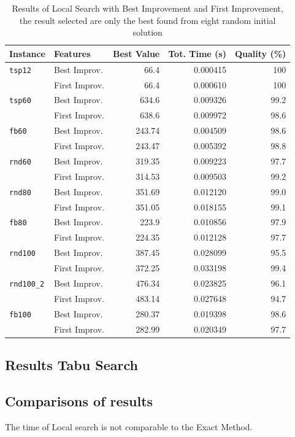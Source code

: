 	\begin{table}
		\centering
		\begin{tabular}{llrrr}
			\toprule
			\textbf{Instance} & \textbf{Features} & \textbf{Best Value} & \textbf{Tot. Time (s)} & \textbf{Quality (\%)} \\
			\midrule
			\verb|tsp12| & Best Improv. & 66.4 & 0.000415 & 100 \\
							& First Improv. & 66.4 & 0.000610 & 100 \\
			\midrule
			\verb|tsp60| 	& Best Improv. & 634.6 & 0.009326 & 99.2 \\
							& First Improv. & 638.6 & 0.009972 & 98.6 \\
			\midrule
			\verb|fb60|		& Best Improv. & 243.74 & 0.004509 & 98.6 \\
							& First Improv. & 243.47 & 0.005392 & 98.8 \\ 
			\midrule
			\verb|rnd60| 	& Best Improv. & 319.35 & 0.009223 & 97.7 \\
							& First Improv. & 314.53 & 0.009503 & 99.2 \\
			\midrule
			\verb|rnd80| 	& Best Improv. & 351.69 & 0.012120 & 99.0 \\
							& First Improv. & 351.05 & 0.018155 & 99.1 \\
			\midrule
			\verb|fb80| 	& Best Improv. & 223.9 & 0.010856 & 97.9 \\
							& First Improv. & 224.35 & 0.012128 & 97.7 \\
			\midrule
			\verb|rnd100| 	& Best Improv. & 387.45 & 0.028099 & 95.5 \\
							& First Improv. & 372.25 & 0.033198 & 99.4 \\
			\midrule
			\verb|rnd100_2| & Best Improv. & 476.34 & 0.023825 & 96.1 \\
							& First Improv. & 483.14 & 0.027648 & 94.7 \\
			\midrule
			\verb|fb100| & Best Improv. & 280.37 & 0.019398 & 98.6 \\
						& First Improv. & 282.99 & 0.020349 & 97.7 \\
			\bottomrule
		\end{tabular}
		\caption{\label{tab:LS-BestStrategyResult} Results of Local Search with Best Improvement and First Improvement, the result selected are only the best found from eight random initial solution}
	\end{table}
	
\newpage
\subsection{Results Tabu Search}


\subsection{Comparisons of results}

	The time of Local search is not comparable to the Exact Method.